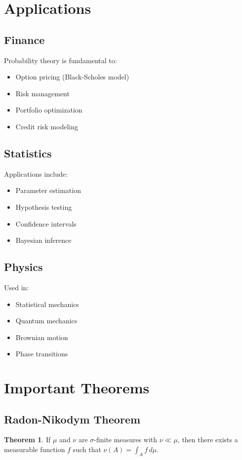 \documentclass[11pt]{article}
\theoremstyle{definition}
\newtheorem{theorem}{Theorem}[section]
\begin{document}
\section{Applications}

\subsection{Finance}
Probability theory is fundamental to:
\begin{itemize}
    \item Option pricing (Black-Scholes model)
    \item Risk management
    \item Portfolio optimization
    \item Credit risk modeling
\end{itemize}

\subsection{Statistics}
Applications include:
\begin{itemize}
    \item Parameter estimation
    \item Hypothesis testing
    \item Confidence intervals
    \item Bayesian inference
\end{itemize}

\subsection{Physics}
Used in:
\begin{itemize}
    \item Statistical mechanics
    \item Quantum mechanics
    \item Brownian motion
    \item Phase transitions
\end{itemize}

\section{Important Theorems}

\subsection{Radon-Nikodym Theorem}
\begin{theorem}
If $\mu$ and $\nu$ are $\sigma$-finite measures with $\nu \ll \mu$, then there exists a measurable function $f$ such that $\nu(A) = \int_A f \, d\mu$.
\end{theorem}
\end{document}
